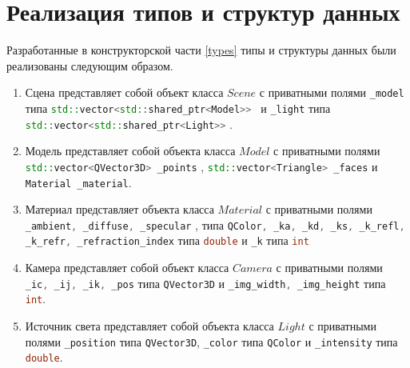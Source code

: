 \section{Реализация типов и структур данных}
Разработанные в конструкторской части \ref{types} типы и структуры данных были реализованы следующим образом.
\begin{enumerate}[label=\arabic*)]
	\item  Сцена представляет собой объект класса $Scene$ с приватными полями \lstinline[language={c++},keywordstyle=\color{black}]{_model} типа
	\lstinline[language={c++},keywordstyle=\color{black}]{std::vector<std::shared_ptr<Model>> } и \lstinline[language={c++},keywordstyle=\color{black}]{_light}  типа \lstinline[language={c++},keywordstyle=\color{black}]{std::vector<std::shared_ptr<Light>>} .
	\item  Модель представляет собой объекта класса $Model$ с приватными полями
	\lstinline[language={c++},keywordstyle=\color{blue}]{std::vector<QVector3D> _points} 
	, \lstinline[language={c++},keywordstyle=\color{black}]{std::vector<Triangle> _faces}  и \lstinline[language={c++},keywordstyle=\color{black}]{Material _material}.
	\item Материал представляет объекта класса $Material$ с приватными полями
	\lstinline[language={c++},keywordstyle=\color{blue}]{_ambient, _diffuse, _specular} , типа \lstinline[language={c++},keywordstyle=\color{black}]{QColor, _ka, _kd, _ks, _k_refl, _k_refr, _refraction_index} типа \lstinline[language={c++},keywordstyle=\color{black}]{double} и \lstinline[language={c++},keywordstyle=\color{black}]{_k} типа \lstinline[language={c++},keywordstyle=\color{black}]{int} 
	\item Камера представляет собой объект класса $Camera$ с приватными полями \lstinline[language={c++},keywordstyle=\color{black}]{_ic, _ij, _ik, _pos} типа \lstinline[language={c++},keywordstyle=\color{black}]{QVector3D} и \lstinline[language={c++},keywordstyle=\color{black}]{_img_width, _img_height} типа \lstinline[language={c++},keywordstyle=\color{black}]{int}.
	\item Источник света представляет собой объекта класса $Light$ с приватными полями \lstinline[language={c++},keywordstyle=\color{black}]{_position} типа \lstinline[language={c++},keywordstyle=\color{black}]{QVector3D}, \lstinline[language={c++},keywordstyle=\color{black}]{_color} типа \lstinline[language={c++},keywordstyle=\color{black}]{QColor} и \lstinline[language={c++},keywordstyle=\color{black}]{_intensity} типа \lstinline[language={c++},keywordstyle=\color{black}]{double}. 
\end{enumerate}

